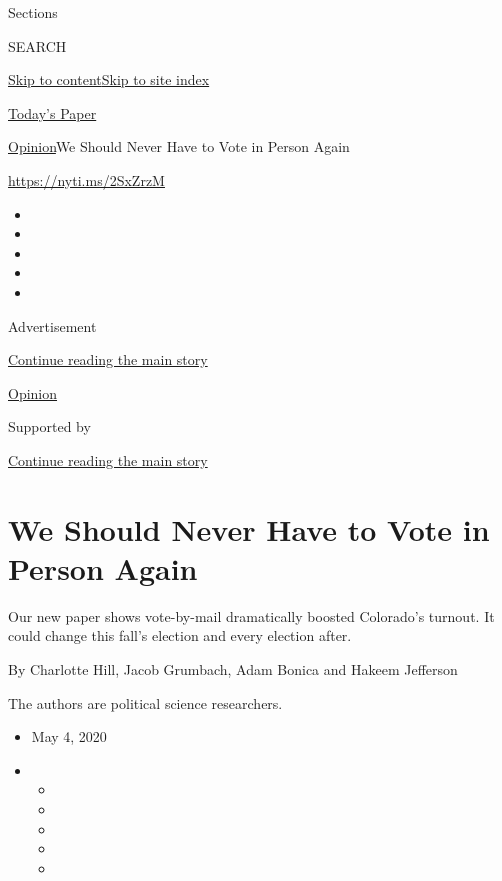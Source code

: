 Sections

SEARCH

\protect\hyperlink{site-content}{Skip to
content}\protect\hyperlink{site-index}{Skip to site index}

\href{https://myaccount.nytimes.com/auth/login?response_type=cookie\&client_id=vi}{}

\href{https://www.nytimes.com/section/todayspaper}{Today's Paper}

\href{/section/opinion}{Opinion}\textbar{}We Should Never Have to Vote
in Person Again

\url{https://nyti.ms/2SxZrzM}

\begin{itemize}
\item
\item
\item
\item
\item
\end{itemize}

Advertisement

\protect\hyperlink{after-top}{Continue reading the main story}

\href{/section/opinion}{Opinion}

Supported by

\protect\hyperlink{after-sponsor}{Continue reading the main story}

\hypertarget{we-should-never-have-to-vote-in-person-again}{%
\section{We Should Never Have to Vote in Person
Again}\label{we-should-never-have-to-vote-in-person-again}}

Our new paper shows vote-by-mail dramatically boosted Colorado's
turnout. It could change this fall's election and every election after.

By Charlotte Hill, Jacob Grumbach, Adam Bonica and Hakeem Jefferson

The authors are political science researchers.

\begin{itemize}
\item
  May 4, 2020
\item
  \begin{itemize}
  \item
  \item
  \item
  \item
  \item
  \end{itemize}
\end{itemize}

